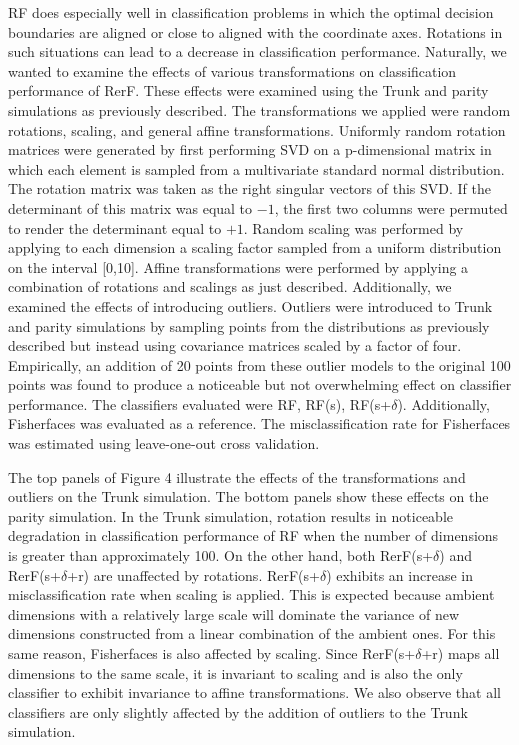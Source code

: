 \documentclass{article} %
\begin{document}
RF does especially well in classification problems in which the optimal decision boundaries are aligned or close to aligned with the coordinate axes. Rotations in such situations can lead to a decrease in classification performance. Naturally, we wanted to examine the effects of various transformations on classification performance of RerF. These effects were examined using the Trunk and parity simulations as previously described. The transformations we applied were random rotations, scaling, and general affine transformations. Uniformly random rotation matrices were generated by first performing SVD on a p-dimensional matrix in which each element is sampled from a multivariate standard normal distribution. The rotation matrix was taken as the right singular vectors of this SVD. If the determinant of this matrix was equal to $-1$, the first two columns were permuted to render the determinant equal to $+1$. Random scaling was performed by applying to each dimension a scaling factor sampled from a uniform distribution on the interval [0,10]. Affine transformations were performed by applying a combination of rotations and scalings as just described. Additionally, we examined the effects of introducing outliers. Outliers were introduced to Trunk and parity simulations by sampling points from the distributions as previously described but instead using covariance matrices scaled by a factor of four. Empirically, an addition of 20 points from these outlier models to the original 100 points was found to produce a noticeable but not overwhelming effect on classifier performance. The classifiers evaluated were RF, RF(s), RF(s+$\delta$). Additionally, Fisherfaces was evaluated as a reference. The misclassification rate for Fisherfaces was estimated using leave-one-out cross validation. 

The top panels of Figure 4 illustrate the effects of the transformations and outliers on the Trunk simulation. The bottom panels show these effects on the parity simulation. In the Trunk simulation, rotation results in noticeable degradation in classification performance of RF when the number of dimensions is greater than approximately 100. On the other hand, both RerF(s+$\delta$) and RerF(s+$\delta$+r) are unaffected by rotations. RerF(s+$\delta$) exhibits an increase in misclassification rate when scaling is applied. This is expected because ambient dimensions with a relatively large scale will dominate the variance of new dimensions constructed from a linear combination of the ambient ones. For this same reason, Fisherfaces is also affected by scaling. Since RerF(s+$\delta$+r) maps all dimensions to the same scale, it is invariant to scaling and is also the only classifier to exhibit invariance to affine transformations. We also observe that all classifiers are only slightly affected by the addition of outliers to the Trunk simulation.
\end{document}
